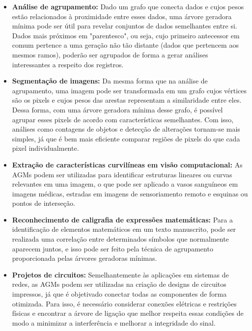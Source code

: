 \documentclass{article}
\begin{document}
\begin{itemize}
    \item \textbf{Análise de agrupamento: } Dado um grafo que conecta dados e cujos pesos estão relacionados à proximidade entre esses dados, uma árvore geradora mínima pode ser útil para revelar conjuntos de dados semelhantes entre si. Dados mais próximos em "parentesco", ou seja, cujo primeiro antecessor em comum pertence a uma geração não tão distante (dados que pertencem aos mesmos ramos), poderão ser agrupados de forma a gerar análises interessantes a respeito dos registros.
    
    \item \textbf{Segmentação de imagens: } Da mesma forma que na análise de agrupamento, uma imagem pode ser transformada em um grafo cujos vértices são os pixels e cujos pesos das arestas representam a similaridade entre eles. Dessa forma, com uma árvore geradora mínima desse grafo, é possível agrupar esses pixels de acordo com características semelhantes. Com isso, análises como contagens de objetos e detecção de alterações tornam-se mais simples, já que é bem mais eficiente comparar regiões de pixels do que cada pixel individualmente.
    
    \item \textbf{Extração de características curvilíneas em visão computacional: } As AGMs podem ser utilizadas para identificar estruturas lineares ou curvas relevantes em uma imagem, o que pode ser aplicado a vasos sanguíneos em imagens médicas, estradas em imagens de sensoriamento remoto e esquinas ou pontos de interseção.
    
    \item \textbf{Reconhecimento de caligrafia de expressões matemáticas: } Para a identificação de elementos matemáticos em um texto manuscrito, pode ser realizada uma correlação entre determinados símbolos que normalmente aparecem juntos, e isso pode ser feito pela técnica de agrupamento proporcionada pelas árvores geradoras mínimas.
    
    \item \textbf{Projetos de circuitos: } Semelhantemente às aplicações em sistemas de redes, as AGMs podem ser utilizadas na criação de designs de circuitos impressos, já que é objetivado conectar todas as componentes de forma otimizada. Para isso, é necessário considerar conexões elétricas e restrições físicas e encontrar a árvore de ligação que melhor respeita essas condições de modo a minimizar a interferência e melhorar a integridade do sinal.
    

\end{itemize}
\end{document}
